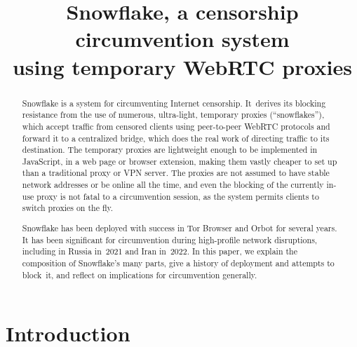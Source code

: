 \documentclass[letterpaper,twocolumn]{article}
\begin{document}
\date{}

\title{Snowflake, a censorship circumvention system \\using temporary WebRTC proxies}

\author{}

\maketitle

\begin{abstract}
Snowflake is a system for circumventing Internet censorship.
It~derives its blocking resistance from
the use of numerous, ultra-light, temporary proxies (``snowflakes''),
which accept traffic from censored clients using peer-to-peer WebRTC protocols
and forward it to a centralized bridge,
which does the real work of directing traffic to its destination.
The temporary proxies are lightweight enough to be implemented in JavaScript,
in a web page or browser extension,
making them vastly cheaper to set up than
a traditional proxy or VPN server.
The proxies are not assumed to have stable network addresses
or be online all the time,
and even the blocking of the currently in-use proxy
is not fatal to a circumvention session,
as the system permits clients to switch proxies on the fly.


Snowflake has been deployed with success
in Tor Browser and Orbot for several years.
It has been significant for circumvention
during high-profile network disruptions,
including in Russia in~2021 and Iran in~2022.
In this paper, we explain the composition of Snowflake's many parts,
give a history of deployment and attempts to block~it,
and reflect on implications for circumvention generally.
\end{abstract}


\section{Introduction}
\label{sec:intro}
\end{document}
